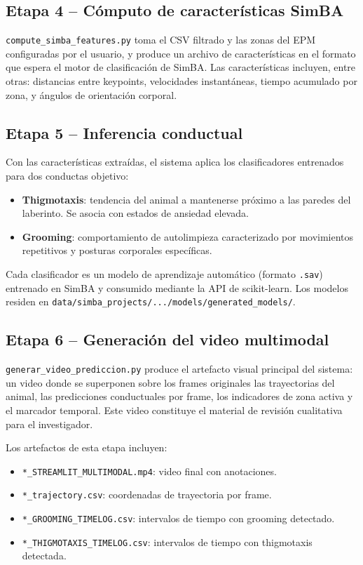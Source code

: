 \documentclass[12pt]{report}
\begin{document}
\subsection{Etapa 4 -- Cómputo de características SimBA}

\texttt{compute\_simba\_features.py} toma el CSV filtrado y las zonas del EPM
configuradas por el usuario, y produce un archivo de características en el
formato que espera el motor de clasificación de SimBA. Las características
incluyen, entre otras: distancias entre keypoints, velocidades instantáneas,
tiempo acumulado por zona, y ángulos de orientación corporal.

\subsection{Etapa 5 -- Inferencia conductual}

Con las características extraídas, el sistema aplica los clasificadores entrenados
para dos conductas objetivo:

\begin{itemize}[leftmargin=*]
    \item \textbf{Thigmotaxis}: tendencia del animal a mantenerse próximo a las paredes
          del laberinto. Se asocia con estados de ansiedad elevada.
    \item \textbf{Grooming}: comportamiento de autolimpieza caracterizado por movimientos
          repetitivos y posturas corporales específicas.
\end{itemize}

Cada clasificador es un modelo de aprendizaje automático (formato \texttt{.sav})
entrenado en SimBA y consumido mediante la API de scikit-learn. Los modelos
residen en \texttt{data/simba\_projects/.../models/generated\_models/}.

\subsection{Etapa 6 -- Generación del video multimodal}

\texttt{generar\_video\_prediccion.py} produce el artefacto visual principal
del sistema: un video donde se superponen sobre los frames originales las
trayectorias del animal, las predicciones conductuales por frame, los
indicadores de zona activa y el marcador temporal. Este video constituye
el material de revisión cualitativa para el investigador.

Los artefactos de esta etapa incluyen:
\begin{itemize}[leftmargin=*]
    \item \texttt{*\_STREAMLIT\_MULTIMODAL.mp4}: video final con anotaciones.
    \item \texttt{*\_trajectory.csv}: coordenadas de trayectoria por frame.
    \item \texttt{*\_GROOMING\_TIMELOG.csv}: intervalos de tiempo con grooming detectado.
    \item \texttt{*\_THIGMOTAXIS\_TIMELOG.csv}: intervalos de tiempo con thigmotaxis detectada.
\end{itemize}
\end{document}
